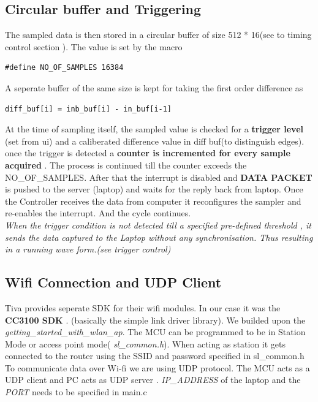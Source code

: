 \documentclass{article}
\begin{document}
	\subsection{Circular buffer and Triggering}
	The sampled data is then stored in a circular buffer of size 512 * 16(see to timing control section ). The value is set by the macro
	\begin{lstlisting}[style=CStyle]
	#define NO_OF_SAMPLES 16384
	\end{lstlisting}
	A seperate buffer of the same size is kept for taking the first order difference as 
	\begin{lstlisting}[style=CStyle]
	diff_buf[i] = inb_buf[i] - in_buf[i-1]
	\end{lstlisting}
	At the time of sampling itself, the sampled value is checked for a \textbf{trigger level} (set from ui) and a caliberated difference value in diff buf(to distinguish edges). once the trigger is detected a \textbf{counter is incremented for every sample acquired} . The process is continued till the counter exceeds the NO\_OF\_SAMPLES. After that the interrupt is disabled and \textbf{DATA PACKET} is pushed to the server (laptop) and waits for the reply back from laptop. Once the Controller receives the data from computer it reconfigures the sampler and re-enables the interrupt. And the cycle continues. \\
	\textit{When the trigger condition is not detected till a specified pre-defined threshold , it sends the data captured to the Laptop without any synchronisation. Thus resulting in a running wave form.(see trigger control)}
	
	\subsection{Wifi Connection and UDP Client }
	Tiva provides seperate SDK for their wifi modules. In our case it was the \textbf{CC3100 SDK} . (basically the simple link driver library). We builded upon the \textit{getting\_started\_with\_wlan\_ap}. The MCU can be programmed to be in Station Mode or access point mode( \textit{sl\_common.h}). When acting as station it gets connected to the router using the SSID and password specified in sl\_common.h\\
	
	To communicate data over Wi-fi we are using UDP protocol. The MCU acts as a UDP client and PC acts as UDP server . \textit{IP\_ADDRESS} of the laptop  and the \textit{PORT} needs to be specified in main.c
	
\end{document}
